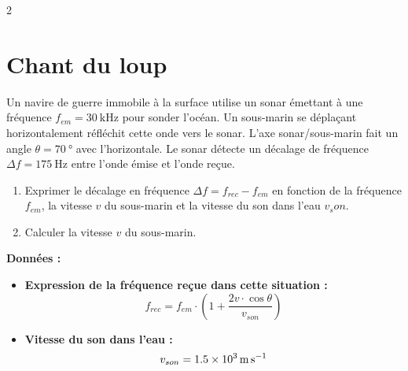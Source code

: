 \documentclass[a4paper,11pt,fleqn]{article}%
\begin{document}
\begin{multicols}{2}
\section{Chant du loup}
Un navire de guerre immobile à la surface utilise un sonar émettant à une fréquence $f_{em}=\SI{30}{\kilo\hertz}$ pour sonder l'océan. Un sous-marin se déplaçant horizontalement réfléchit cette onde vers le sonar. L'axe sonar/sous-marin fait un angle $\theta = \SI{70}{\degree}$ avec l'horizontale. Le sonar détecte un décalage de fréquence $\Delta f =\SI{175}{\hertz}$ entre l'onde émise et l'onde reçue.

\begin{enumerate}
    \item Exprimer le décalage en fréquence $\Delta f = f_{rec} - f_{em}$ en fonction de la fréquence $f_{em}$, la vitesse $v$ du sous-marin et la vitesse du son dans l'eau $v_son$.
    \item Calculer la vitesse $v$ du sous-marin.
\end{enumerate}
\textbf{Données :}
\begin{itemize}
    \item \textbf{Expression de la fréquence reçue dans cette situation :} $$f_{rec} = f_{em}\cdot \left(1+\dfrac{2v \cdot \cos{\theta}}{v_{son}}\right) $$
    \item \textbf{Vitesse du son dans l'eau :} $$v_{son} =\SI{1.5E3}{\meter\per\second}$$
\end{itemize}
\end{multicols}
\end{document}
